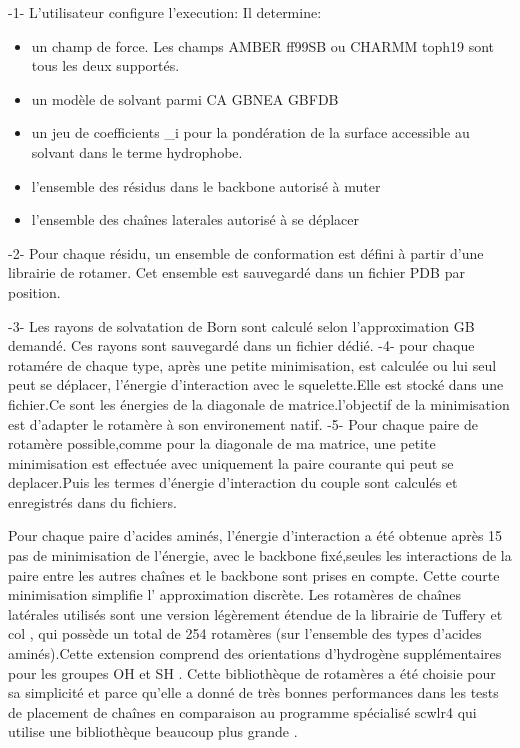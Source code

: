 \begin{enumerate}
-1- L'utilisateur configure l'execution:
Il determine:
\begin{itemize}
\item un champ de force. Les champs AMBER ff99SB ou CHARMM toph19 sont tous les deux supportés.
\item un modèle de solvant parmi CA GBNEA GBFDB
\item un jeu de coefficients \sigma_i pour la pondération de la surface accessible au solvant dans le terme hydrophobe.
\item l'ensemble des résidus dans le backbone autorisé à muter
\item l'ensemble des chaînes laterales autorisé à se déplacer 
\end{itemize}


-2- Pour chaque résidu, un ensemble de conformation est défini à partir d'une librairie de rotamer. Cet ensemble est sauvegardé dans un fichier PDB par position.

-3- Les rayons de solvatation de Born sont calculé selon l'approximation GB demandé. Ces rayons sont sauvegardé dans un fichier dédié.
-4- pour chaque rotamére de chaque type, après une petite minimisation, est calculée ou lui seul peut se déplacer, l'énergie d'interaction avec le squelette.Elle est stocké dans une fichier.Ce sont les énergies de la diagonale de matrice.l'objectif de la minimisation est d'adapter le rotamère à son environement natif.
-5- Pour chaque paire de rotamère possible,comme pour la diagonale de ma matrice, une petite minimisation est effectuée avec uniquement la paire courante qui peut se deplacer.Puis les termes d'énergie d'interaction du couple sont  calculés et enregistrés dans du fichiers.  
\end{enumerate}

Pour chaque paire d'acides aminés, l'énergie d'interaction a été obtenue après 15 pas de minimisation de l'énergie, avec le backbone fixé,seules les interactions de la paire entre les autres chaînes et le backbone sont prises en compte. Cette courte minimisation simplifie l' approximation discrète. Les rotamères de chaînes latérales utilisés sont une version légèrement étendue de la librairie de Tuffery et col \cite{Tuffery91}, qui possède un total de 254 rotamères (sur l'ensemble des types d'acides aminés).Cette extension comprend des orientations d'hydrogène supplémentaires pour les groupes OH et SH \cite{Gaillard14}. Cette bibliothèque de rotamères a été choisie pour sa simplicité et parce qu'elle a donné de très bonnes performances dans les tests de placement de chaînes en comparaison au programme spécialisé scwlr4 qui utilise une bibliothèque beaucoup plus grande \cite{Krivov09,Gaillard16}.


